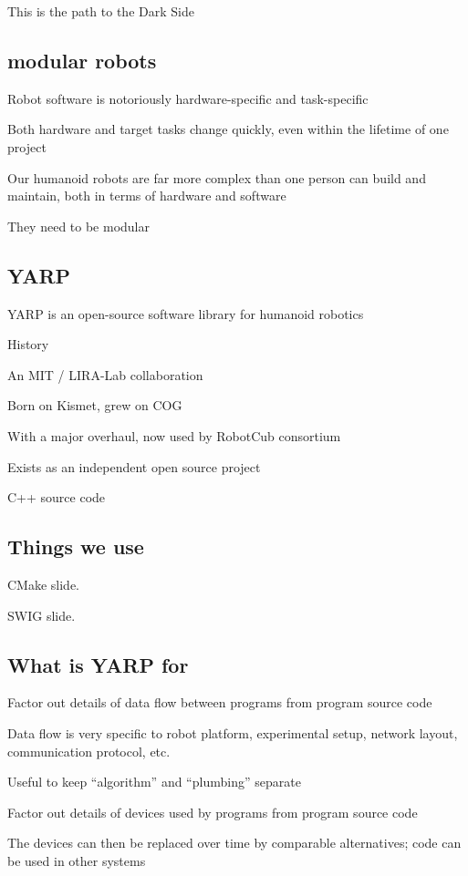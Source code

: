 This is the path to the Dark Side

\subsection{modular robots}

Robot software is notoriously hardware-specific and task-specific

Both hardware and target tasks change quickly, even within the
lifetime of one project

Our humanoid robots are far more complex than one person can build and
maintain, both in terms of hardware and software

They need to be modular


\subsection{YARP}

YARP is an open-source software library  for humanoid robotics

History

An MIT / LIRA-Lab collaboration

Born on Kismet, grew on COG

With a major overhaul, now used by RobotCub consortium

Exists as an independent open source project

C++ source code


\subsection{Things we use}

CMake slide.

SWIG slide.


\subsection{What is YARP for}


Factor out details of data flow between programs from program source code

Data flow is very specific to robot platform, experimental setup,
network layout, communication protocol, etc.

Useful to keep ``algorithm'' and ``plumbing'' separate

Factor out details of devices used by programs from program source code

The devices can then be replaced over time by comparable alternatives;
code can be used in other systems


